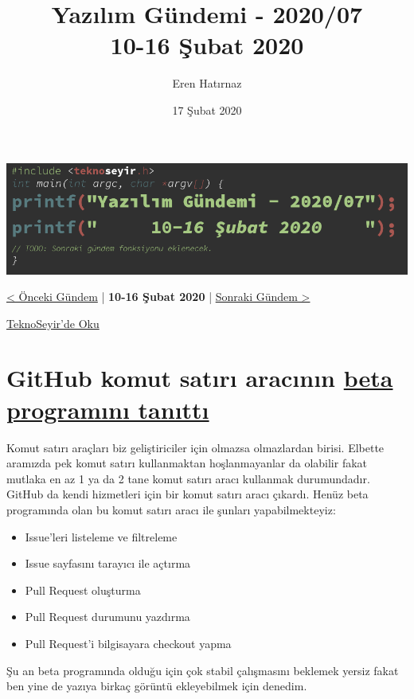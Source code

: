 \documentclass[11pt]{article}
\author{Eren Hatırnaz}
\date{17 Şubat 2020}
\title{Yazılım Gündemi - 2020/07\\\medskip
\large 10-16 Şubat 2020}
\begin{document}
\maketitle
\tableofcontents \clearpage\shorthandoff{=}

\begin{center}
\includegraphics[width=.9\linewidth]{gorseller/yazilim-gundemi-banner.png}
\end{center}

\begin{center}
\href{../06/yazilim-gundemi-2020-06.pdf}{< Önceki Gündem} | \textbf{10-16 Şubat 2020} | \href{../08/yazilim-gundemi-2020-08.pdf}{Sonraki Gündem >}

\href{https://teknoseyir.com/blog/yazilim-gundemi-2020-07}{TeknoSeyir'de Oku}
\end{center}

\section{GitHub komut satırı aracının \href{https://github.blog/2020-02-12-supercharge-your-command-line-experience-github-cli-is-now-in-beta/}{beta programını tanıttı}}
\label{sec:orge328045}
Komut satırı araçları biz geliştiriciler için olmazsa olmazlardan birisi.
Elbette aramızda pek komut satırı kullanmaktan hoşlanmayanlar da olabilir
fakat mutlaka en az 1 ya da 2 tane komut satırı aracı kullanmak durumundadır.
GitHub da kendi hizmetleri için bir komut satırı aracı çıkardı. Henüz beta
programında olan bu komut satırı aracı ile şunları yapabilmekteyiz:

\begin{itemize}
\item Issue'leri listeleme ve filtreleme
\item Issue sayfasını tarayıcı ile açtırma
\item Pull Request oluşturma
\item Pull Request durumunu yazdırma
\item Pull Request'i bilgisayara checkout yapma
\end{itemize}

Şu an beta programında olduğu için çok stabil çalışmasını beklemek yersiz
fakat ben yine de yazıya birkaç görüntü ekleyebilmek için denedim.
\end{document}
